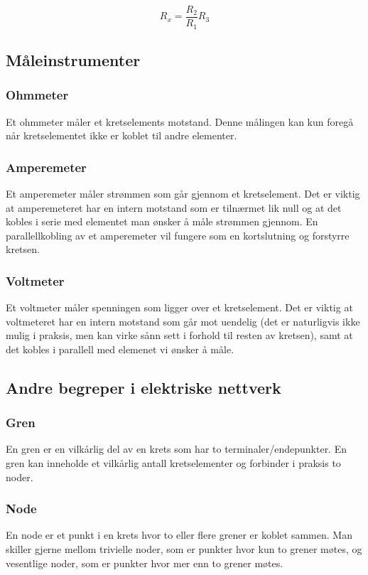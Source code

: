 \documentclass[norsk, a4paper, 12pt, twoside, titlepage]{article}
\begin{document}
\begin{equation}
R_{x} = \frac{R_{2}}{R_{1}}R_{3}
\end{equation}


\subsection{Måleinstrumenter}
\subsubsection{Ohmmeter}
Et ohmmeter måler et kretselements motstand.  Denne målingen kan kun
foregå når kretselementet ikke er koblet til andre elementer.

\subsubsection{Amperemeter}
Et amperemeter måler strømmen som går gjennom et kretselement.  Det er
viktig at amperemeteret har en intern motstand som er tilnærmet lik
null og at det kobles i serie med elementet man ønsker å måle strømmen
gjennom. En parallellkobling av et amperemeter vil fungere som en
kortslutning og forstyrre kretsen.

\subsubsection{Voltmeter}
Et voltmeter måler spenningen som ligger over et kretselement.  Det er
viktig at voltmeteret har en intern motstand som går mot uendelig (det
er naturligvis ikke mulig i praksis, men kan virke sånn sett i forhold
til resten av kretsen), samt at det kobles i parallell med elemenet vi
ønsker å måle.

\subsection{Andre begreper i elektriske nettverk}
\subsubsection{Gren}
En gren er en vilkårlig del av en krets som har to
terminaler/endepunkter.  En gren kan inneholde et vilkårlig antall
kretselementer og forbinder i praksis to noder.

\subsubsection{Node}
En node er et punkt i en krets hvor to eller flere grener er koblet
sammen.  Man skiller gjerne mellom trivielle noder, som er punkter
hvor kun to grener møtes, og vesentlige noder, som er punkter hvor mer
enn to grener møtes.
\end{document}
